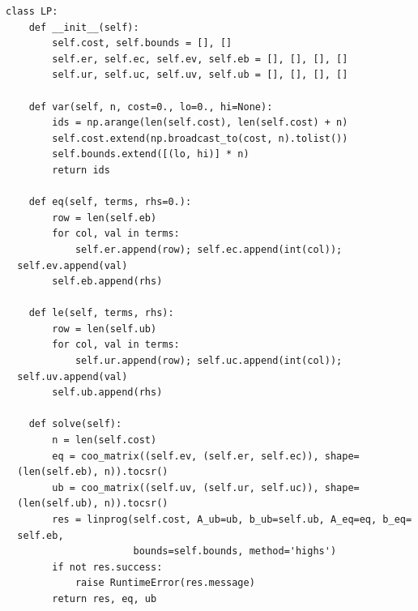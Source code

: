 \begin{verbatim}
class LP:
    def __init__(self):
        self.cost, self.bounds = [], []
        self.er, self.ec, self.ev, self.eb = [], [], [], []
        self.ur, self.uc, self.uv, self.ub = [], [], [], []

    def var(self, n, cost=0., lo=0., hi=None):
        ids = np.arange(len(self.cost), len(self.cost) + n)
        self.cost.extend(np.broadcast_to(cost, n).tolist())
        self.bounds.extend([(lo, hi)] * n)
        return ids

    def eq(self, terms, rhs=0.):
        row = len(self.eb)
        for col, val in terms:
            self.er.append(row); self.ec.append(int(col));
  self.ev.append(val)
        self.eb.append(rhs)

    def le(self, terms, rhs):
        row = len(self.ub)
        for col, val in terms:
            self.ur.append(row); self.uc.append(int(col));
  self.uv.append(val)
        self.ub.append(rhs)

    def solve(self):
        n = len(self.cost)
        eq = coo_matrix((self.ev, (self.er, self.ec)), shape=
  (len(self.eb), n)).tocsr()
        ub = coo_matrix((self.uv, (self.ur, self.uc)), shape=
  (len(self.ub), n)).tocsr()
        res = linprog(self.cost, A_ub=ub, b_ub=self.ub, A_eq=eq, b_eq=
  self.eb,
                      bounds=self.bounds, method='highs')
        if not res.success:
            raise RuntimeError(res.message)
        return res, eq, ub



\end{verbatim}
